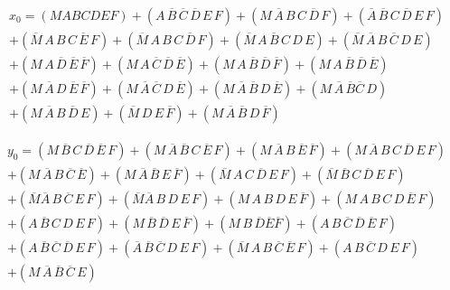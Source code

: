 \documentclass[12pt, oneside, openany]{article}
\begin{document}
{    \begin{multline*}
        x_0 = (MABCDEF) + (A\,\overline{B}\,\overline{C}\,\overline{D}\,E\,F) + (M\,\overline{A}\,B\,C\,\overline{D}\,F) + (\overline{A}\,\overline{B}\,C\,\overline{D}\,E\,F) \\
        + (\overline{M}\,A\,B\,C\,\overline{E}\,F) + (\overline{M}\,A\,B\,C\,\overline{D}\,F) + (\overline{M}\,A\,\overline{B}\,C\,D\,E) + (\overline{M}\,\overline{A}\,B\,\overline{C}\,D\,E) \\
        + (M\,A\,\overline{D}\,\overline{E}\,\overline{F}) + (M\,A\,\overline{C}\,\overline{D}\,\overline{E}) + (M\,A\,\overline{B}\,\overline{D}\,\overline{F}) + (M\,A\,\overline{B}\,\overline{D}\,\overline{E}) \\
        + (M\,\overline{A}\,D\,\overline{E}\,\overline{F}) + (M\,\overline{A}\,\overline{C}\,D\,\overline{E}) + (M\,\overline{A}\,\overline{B}\,D\,\overline{E}) + (M\,\overline{A}\,\overline{B}\overline{C}\,D) \\
        + (M\,\overline{A}\,B\,\overline{D}\,E) + (\overline{M}\,D\,E\,\overline{F}) + (M\,\overline{A}\,\overline{B}\,D\,\overline{F})
    \end{multline*}
    
    \begin{multline*}
        y_0 = (M\,\overline{B}\,C\,\overline{D}\,\overline{E}\,F) + (M\,\overline{A}\,\overline{B}\,C\,\overline{E}\,F) + (M\,\overline{A}\,B\,\overline{E}\,\overline{F}) + (M\,\overline{A}\,B\,C\,\overline{D}\,E\,F) \\
        + (M\,\overline{A}\,B\,\overline{C}\,\overline{E}) + (M\,\overline{A}\,\overline{B}\,E\,\overline{F}) + (\overline{M}\,A\,C\,\overline{D}\,E\,F) + (\overline{M}\,\overline{B}\,C\,\overline{D}\,E\,F) \\
        + (\overline{M}\overline{A}\,B\,\overline{C}\,E\,F) + (\overline{M}\overline{A}\,B\,D\,E\,F) + (M\,A\,B\,D\,E\,\overline{F}) + (M\,A\,B\,C\,D\,\overline{E}\,F) \\
        + (A\,\overline{B}\,C\,D\,E\,F) + (M\,\overline{B}\,\overline{D}\,E\,\overline{F}) + (M\,B\,\overline{D}\overline{E}\overline{F}) + (A\,B\,\overline{C}\,\overline{D}\,\overline{E}\,F) \\
        + (A\,\overline{B}\,\overline{C}\,\overline{D}\,E\,F) + (\overline{A}\,\overline{B}\,\overline{C}\,D\,E\,F) + (\overline{M}\,A\,B\,\overline{C}\,\overline{E}\,F) + (A\,B\,\overline{C}\,D\,E\,F) \\
        + (M\,\overline{A}\,\overline{B}\,\overline{C}\,E)
    \end{multline*}
    
}
\end{document}
